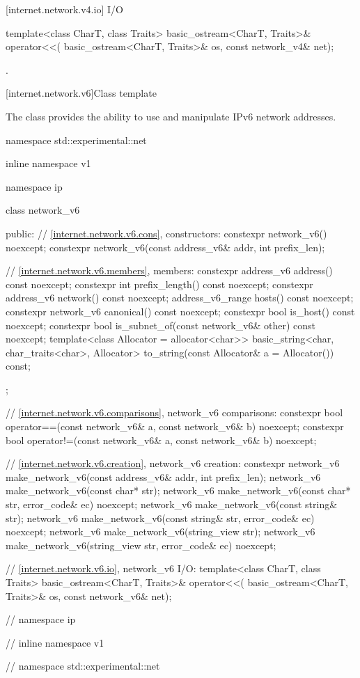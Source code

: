 [internet.network.v4.io]{ I/O}

\begin{itemdecl}
template<class CharT, class Traits>
  basic_ostream<CharT, Traits>& operator<<(
    basic_ostream<CharT, Traits>& os, const network_v4& net);
\end{itemdecl}

\begin{itemdescr}
\pnum
\returns {}.
\end{itemdescr}




%
[internet.network.v6]{Class template }

\pnum
The class  provides the ability to use and manipulate IPv6 network addresses.

\begin{codeblock}
namespace std::experimental::net {
inline namespace v1 {
namespace ip {

  class network_v6
  {
  public:
    // \ref{internet.network.v6.cons}, constructors:
    constexpr network_v6() noexcept;
    constexpr network_v6(const address_v6& addr, int prefix_len);

    // \ref{internet.network.v6.members}, members:
    constexpr address_v6 address() const noexcept;
    constexpr int prefix_length() const noexcept;
    constexpr address_v6 network() const noexcept;
    address_v6_range hosts() const noexcept;
    constexpr network_v6 canonical() const noexcept;
    constexpr bool is_host() const noexcept;
    constexpr bool is_subnet_of(const network_v6& other) const noexcept;
    template<class Allocator = allocator<char>>
      basic_string<char, char_traits<char>, Allocator>
        to_string(const Allocator& a = Allocator()) const;
  };

  // \ref{internet.network.v6.comparisons}, network_v6 comparisons:
  constexpr bool operator==(const network_v6& a, const network_v6& b) noexcept;
  constexpr bool operator!=(const network_v6& a, const network_v6& b) noexcept;

  // \ref{internet.network.v6.creation}, network_v6 creation:
  constexpr network_v6 make_network_v6(const address_v6& addr, int prefix_len);
  network_v6 make_network_v6(const char* str);
  network_v6 make_network_v6(const char* str, error_code& ec) noexcept;
  network_v6 make_network_v6(const string& str);
  network_v6 make_network_v6(const string& str, error_code& ec) noexcept;
  network_v6 make_network_v6(string_view str);
  network_v6 make_network_v6(string_view str, error_code& ec) noexcept;

  // \ref{internet.network.v6.io}, network_v6 I/O:
  template<class CharT, class Traits>
    basic_ostream<CharT, Traits>& operator<<(
      basic_ostream<CharT, Traits>& os, const network_v6& net);

} // namespace ip
} // inline namespace v1
} // namespace std::experimental::net
\end{codeblock}

